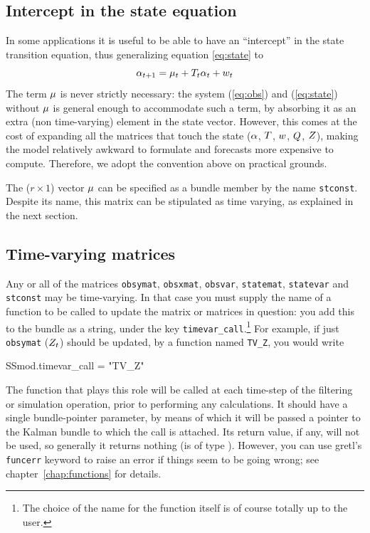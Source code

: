 \subsection{Intercept in the state equation}
\label{sec:stconst}

In some applications it is useful to be able to have an ``intercept''
in the state transition equation, thus generalizing equation
\eqref{eq:state} to
\[
  \alpha_{t+1} = \mu_t + T_t \alpha_t + w_t \\
\]
The term $\mu$ is never strictly necessary: the system
(\ref{eq:obs}) and  (\ref{eq:state}) without $\mu$ is general
enough to accommodate such a term, by absorbing it as an extra (non
time-varying) element in the state vector.  However, this comes at the
cost of expanding all the matrices that touch the state ($\alpha$,
$T$, $w$, $Q$, $Z$), making the model
relatively awkward to formulate and forecasts more expensive to
compute. Therefore, we adopt the convention above on practical
grounds.

The ($r \times 1$) vector $\mu$ can be specified as a bundle
member by the name \texttt{stconst}. Despite its name, this matrix can
be stipulated as time varying, as explained in the next section.

\subsection{Time-varying matrices}
\label{sec:tvarying}

Any or all of the matrices \texttt{obsymat}, \texttt{obsxmat},
\texttt{obsvar}, \texttt{statemat}, \texttt{statevar} and
\texttt{stconst} may be time-varying.  In that case you must supply
the name of a function to be called to update the matrix or matrices
in question: you add this to the bundle as a string, under the key
\texttt{timevar\_call}.\footnote{The choice of the name for the
  function itself is of course totally up to the user.} For example,
if just \texttt{obsymat} ($Z_t$) should be updated, by a
function named \texttt{TV\_Z}, you would write
%
\begin{code}
SSmod.timevar_call = "TV_Z"
\end{code}
%
The function that plays this role will be called at each time-step of
the filtering or simulation operation, prior to performing any
calculations. It should have a single bundle-pointer parameter, by
means of which it will be passed a pointer to the Kalman bundle to
which the call is attached.  Its return value, if any, will not be
used, so generally it returns nothing (is of type ).
However, you can use gretl's \texttt{funcerr} keyword to raise an
error if things seem to be going wrong; see
chapter~\ref{chap:functions} for details.

